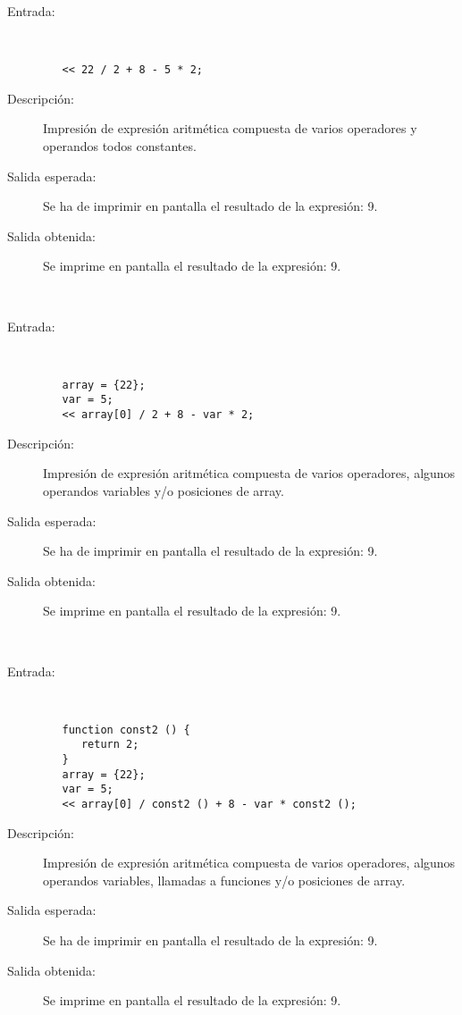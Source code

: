 	\begin{description}
		\item [Entrada:] \hfill \\
\begin{lstlisting}
   << 22 / 2 + 8 - 5 * 2;
\end{lstlisting}
		\item [Descripción:] Impresión de expresión aritmética compuesta de varios operadores y operandos todos constantes.
		\item [Salida esperada:] Se ha de imprimir en pantalla el resultado de la expresión: 9.
		\item [Salida obtenida:] Se imprime en pantalla el resultado de la expresión: 9.
	\end{description}
\hfil \\
	\begin{description}
		\item [Entrada:] \hfill \\
\begin{lstlisting}
   array = {22};
   var = 5;
   << array[0] / 2 + 8 - var * 2;
\end{lstlisting}
		\item [Descripción:] Impresión de expresión aritmética compuesta de varios operadores, algunos operandos variables y/o posiciones de array.
		\item [Salida esperada:] Se ha de imprimir en pantalla el resultado de la expresión: 9.
		\item [Salida obtenida:] Se imprime en pantalla el resultado de la expresión: 9.
	\end{description}
\hfil \\
	\begin{description}
		\item [Entrada:] \hfill \\
\begin{lstlisting}
   function const2 () {
      return 2;
   }
   array = {22};
   var = 5;
   << array[0] / const2 () + 8 - var * const2 ();
\end{lstlisting}
		\item [Descripción:] Impresión de expresión aritmética compuesta de varios operadores, algunos operandos variables, llamadas a funciones y/o posiciones de array.
		\item [Salida esperada:] Se ha de imprimir en pantalla el resultado de la expresión: 9.
		\item [Salida obtenida:] Se imprime en pantalla el resultado de la expresión: 9.
	\end{description}
